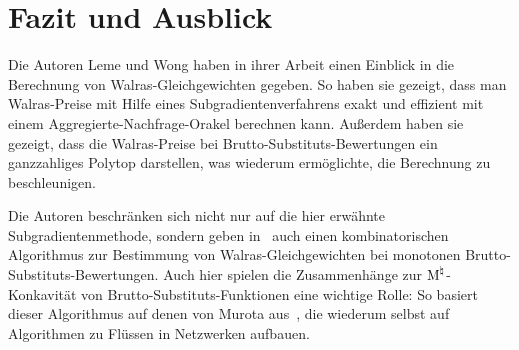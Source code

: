 \section{Fazit und Ausblick}

Die Autoren Leme und Wong haben in ihrer Arbeit einen Einblick in die Berechnung von Walras-Gleichgewichten gegeben.
So haben sie gezeigt, dass man Walras-Preise mit Hilfe eines Subgradientenverfahrens exakt und effizient mit einem Aggregierte-Nachfrage-Orakel berechnen kann.
Außerdem haben sie gezeigt, dass die Walras-Preise bei Brutto-Substituts-Bewertungen ein ganzzahliges Polytop darstellen, was wiederum ermöglichte, die Berechnung zu beschleunigen.

Die Autoren beschränken sich nicht nur auf die hier erwähnte Subgradientenmethode, sondern geben in~\cite[Abschnitt~7]{PaesLeme2018} auch einen kombinatorischen Algorithmus zur Bestimmung von Walras-Gleichgewichten bei monotonen
 Brutto-Substituts-Bewertungen.
 Auch hier spielen die Zusammenhänge zur $\textrm{\textup{M}}^\natural$-Konkavität von Brutto-Substituts-Funktionen eine wichtige Rolle: So basiert dieser Algorithmus auf denen von Murota aus~\cite[Abschnitt~10.4]{Murota2003}, die wiederum selbst auf Algorithmen zu Flüssen in Netzwerken aufbauen.